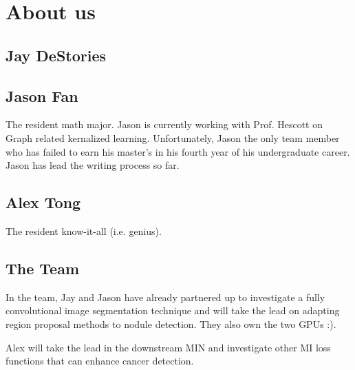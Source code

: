 \documentclass[twocolumn,10pt]{article}
\begin{document}
\section{About us}
\subsection{Jay DeStories}
\subsection{Jason Fan}
The resident math major. Jason is currently working with Prof. Hescott on Graph
related kernalized learning. Unfortunately, Jason the only team member 
who has failed to earn his master's in his fourth year of his undergraduate career.
Jason has lead the writing process so far.

\subsection{Alex Tong}
The resident know-it-all (i.e. genius).

\subsection{The Team}
In the team, Jay and Jason have already partnered up to investigate a
fully convolutional image segmentation technique and will take the lead on
adapting region proposal methods to nodule detection. They also own the
two GPUs :).

Alex will take the lead in the downstream MIN and investigate other MI loss 
functions that can enhance cancer detection.


\end{document}
